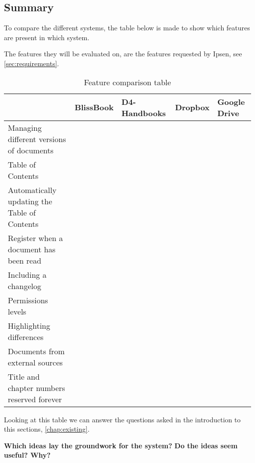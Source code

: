 \subsection{Summary}
To compare the different systems, the table below is made to show which features are present in which system.

The features they will be evaluated on, are the features requested by Ipsen, see \cref{sec:requirements}.

\begin{table}[H]
	\begin{center}
		\begin{tabular}{| m{5cm}|m{1.6cm}|m{2cm}|m{1.5cm}|m{1.2cm}|}
			\hline
			& BlissBook  & D4-Handbooks & Dropbox & Google \newline Drive \\
			\hline
			Managing different versions of documents & \checkmark &  &  & \checkmark \\
			\hline
			Table of Contents & \checkmark & \checkmark  & & \\
			\hline
			Automatically updating the Table of Contents & \checkmark & \checkmark  &  & \\
			\hline
			Register when a document has been read & \checkmark & \checkmark &  & \\
			\hline
			Including a changelog & \checkmark & \checkmark  &  & \\
			\hline
			Permissions levels & \checkmark &  & \checkmark & \checkmark \\
			\hline
			Highlighting differences & \checkmark &  &  & \checkmark\\
			\hline
			Documents from external \newline sources &  &  & \checkmark & \checkmark \\
			\hline
			Title and chapter numbers \newline reserved forever &  &  &  & \\
			\hline
		\end{tabular}
		\caption{Feature comparison table}\label{tab:Exsisting}
	\end{center}
\end{table}

Looking at this table we can answer the questions asked in the introduction to this sections, \cref{chap:existing}.

\textbf{Which ideas lay the groundwork for the system?}
\newline\indent
\textbf{Do the ideas seem useful? Why?}

